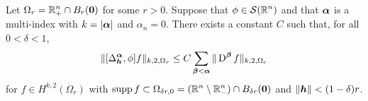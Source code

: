 \begin{cor} \label{ell_reg_cor2}
Let $\displaystyle \Omega_r = \mathbb{R}^n_+ \cap B_r({\bm{0}})$ for some $r>0$.
Suppose that $\displaystyle \phi \in \mathcal{S}(\mathbb{R}^n)$
and that ${\bm{\alpha}}$ is a multi-index with $k = |{\bm{\alpha}}|$ and
$\alpha_n=0$.  There exists a constant $C$ such that, for all $0 < \delta <1$,
\begin{equation} \label{ellRegCor2Eq1}
\| [\Delta^{{\bm{\alpha}}}_{{\bm{h}}}, \phi] f \|_{k,2,\Omega_r} \leq C
\sum_{{\bm{\beta}}<{\bm{\alpha}}} \| \operatorname{D}^{{\bm{\beta}}} f\|_{k,2,\Omega_r}
\end{equation}
for $\displaystyle f \in H^{k,2}(\Omega_r)$ with
$\displaystyle \operatorname{supp} f \subset \Omega_{\delta r,0}
= (\mathbb{R}^n \setminus \mathbb{R}^n_-) \cap B_{\delta r}({\bm{0}})$ and
$\|{\bm{h}}\|<(1-\delta)r$.
\end{cor}

